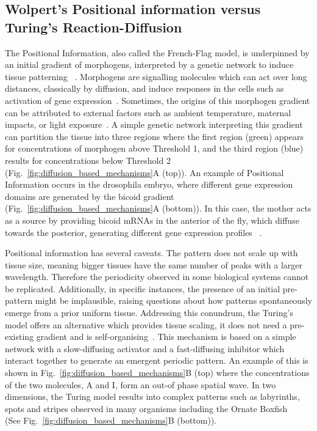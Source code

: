 \subsection{Wolpert's Positional information versus Turing's Reaction-Diffusion}
The Positional Information, also called the French-Flag model, is underpinned by an initial gradient of morphogens, interpreted by a genetic network to induce tissue patterning ~\parencite{Wolpert1969}.
Morphogens are signalling molecules which can act over long distances, classically by diffusion, and induce responses in the cells such as activation of gene expression~\parencite{rogers2011morphogen}.
Sometimes, the origins of this morphogen gradient can be attributed to external factors such as ambient temperature, maternal impacts, or light exposure~\parencite{Schier2009}.
A simple genetic network interpreting this gradient can partition the tissue into three regions where the first region (green) appears for concentrations of morphogen above Threshold 1, and the third region (blue) results for concentrations below Threshold 2 (Fig.~\ref{fig:diffusion_based_mechanisms}A (top)).
An example of Positional Information occurs in the drosophila embryo, where different gene expression domains are generated by the bicoid gradient (Fig.~\ref{fig:diffusion_based_mechanisms}A (bottom)).
In this case, the mother acts as a source by providing bicoid mRNAs in the anterior of the fly, which diffuse towards the posterior, generating different gene expression profiles ~\parencite{grimm2010modelling}.

Positional information has several caveats.
The pattern does not scale up with tissue size, meaning bigger tissues have the same number of peaks with a larger wavelength.
Therefore the periodicity observed in some biological systems cannot be replicated.
Additionally, in specific instances, the presence of an initial pre-pattern might be implausible, raising questions about how patterns spontaneously emerge from a prior uniform tissue.
Addressing this conundrum, the Turing's model offers an alternative which provides tissue scaling, it does not need a pre-existing gradient and is self-organising~\parencite{Turing1952, Kondo2010a}.
This mechanism is based on a simple network with a slow-diffusing activator and a fast-diffusing inhibitor which interact together to generate an emergent periodic pattern.
An example of this is shown in Fig.~\ref{fig:diffusion_based_mechanisms}B (top) where the concentrations of the two molecules, A and I, form an out-of phase spatial wave.
In two dimensions, the Turing model results into complex patterns such as labyrinths, spots and stripes observed in many organisms including the Ornate Boxfish ~\parencite{Alessio2023} (See Fig.~\ref{fig:diffusion_based_mechanisms}B (bottom)).

